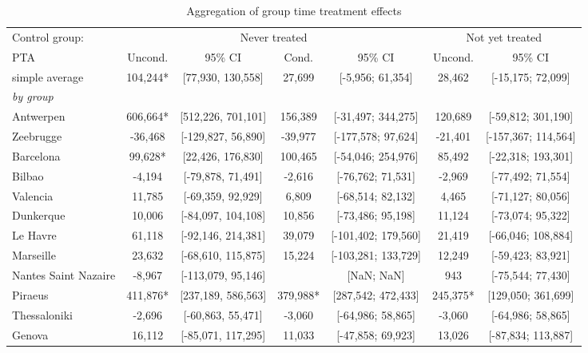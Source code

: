 \begin{table}[ht]
\centering
\caption{Aggregation of group time treatment effects} 
\begingroup\begin{adjustbox}{max width=\textwidth}
\begin{tabular}{lcccccc}
  \hline
\hline
Control group: & \multicolumn{4}{c}{Never treated} & \multicolumn{2}{c}{Not yet treated} \\
 \cmidrule(lr){2-5} \cmidrule(lr){6-7}  PTA & Uncond. & 95\% CI & Cond. & 95\% CI & Uncond. & 95\% CI  \\ 
  \hline
simple average & 104,244* & [77,930, 130,558] &   27,699 & [-5,956; 61,354] &  28,462 & [-15,175; 72,099] \\ 
   [1ex]\emph{by group} &  &  &  &  &  &  \\ 
   \hline
Antwerpen & 606,664* & [512,226, 701,101] &  156,389 & [-31,497; 344,275] & 120,689 & [-59,812; 301,190] \\ 
  Zeebrugge & -36,468 & [-129,827, 56,890] &  -39,977 & [-177,578; 97,624] & -21,401 & [-157,367; 114,564] \\ 
  Barcelona &  99,628* & [22,426, 176,830] &  100,465 & [-54,046; 254,976] &  85,492 & [-22,318; 193,301] \\ 
  Bilbao &  -4,194 & [-79,878, 71,491] &   -2,616 & [-76,762; 71,531] &  -2,969 & [-77,492; 71,554] \\ 
  Valencia &  11,785 & [-69,359, 92,929] &    6,809 & [-68,514; 82,132] &   4,465 & [-71,127; 80,056] \\ 
  Dunkerque &  10,006 & [-84,097, 104,108] &   10,856 & [-73,486; 95,198] &  11,124 & [-73,074; 95,322] \\ 
  Le Havre &  61,118 & [-92,146, 214,381] &   39,079 & [-101,402; 179,560] &  21,419 & [-66,046; 108,884] \\ 
  Marseille &  23,632 & [-68,610, 115,875] &   15,224 & [-103,281; 133,729] &  12,249 & [-59,423; 83,921] \\ 
  Nantes Saint Nazaire &  -8,967 & [-113,079, 95,146] &  & [NaN; NaN] &     943 & [-75,544; 77,430] \\ 
  Piraeus & 411,876* & [237,189, 586,563] &  379,988* & [287,542; 472,433] & 245,375* & [129,050; 361,699] \\ 
  Thessaloniki &  -2,696 & [-60,863, 55,471] &   -3,060 & [-64,986; 58,865] &  -3,060 & [-64,986; 58,865] \\ 
  Genova &  16,112 & [-85,071, 117,295] &   11,033 & [-47,858; 69,923] &  13,026 & [-87,834; 113,887] \\ 

\end{tabular}
\end{adjustbox}
\end{table}
